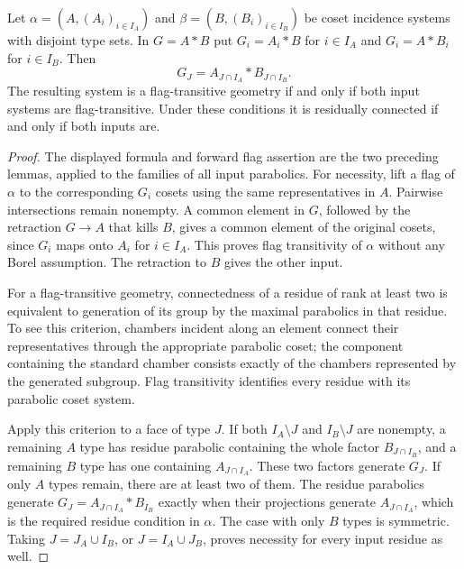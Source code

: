 \begin{theorem}\label{thm:free}
Let $\alpha=(A,(A_i)_{i\in I_A})$ and
$\beta=(B,(B_i)_{i\in I_B})$ be coset incidence systems with disjoint
type sets. In $G=A*B$ put $G_i=A_i*B$ for $i\in I_A$ and
$G_i=A*B_i$ for $i\in I_B$. Then
\[
 G_J=A_{J\cap I_A}*B_{J\cap I_B}.
\]
The resulting system is a flag-transitive geometry if and only if
both input systems are flag-transitive. Under these conditions it is
residually connected if and only if both inputs are.
\end{theorem}
\begin{proof}
The displayed formula and forward flag assertion are the two preceding
lemmas, applied to the families of all input parabolics. For necessity,
lift a flag of $\alpha$ to the corresponding $G_i$ cosets using the
same representatives in $A$. Pairwise intersections remain nonempty.
A common element in $G$, followed by the retraction $G\to A$ that
kills $B$, gives a common element of the original cosets, since
$G_i$ maps onto $A_i$ for $i\in I_A$. This proves flag transitivity
of $\alpha$ without any Borel assumption. The retraction to $B$
gives the other input.

For a flag-transitive geometry, connectedness of a residue of rank at
least two is equivalent to generation of its group by the maximal
parabolics in that residue. To see this criterion, chambers incident
along an element connect their representatives through the appropriate
parabolic coset; the component containing the standard chamber consists
exactly of the chambers represented by the generated subgroup. Flag
transitivity identifies every residue with its parabolic coset system.

Apply this criterion to a face of type $J$. If both
$I_A\setminus J$ and $I_B\setminus J$ are nonempty, a remaining
$A$ type has residue parabolic containing the whole factor
$B_{J\cap I_B}$, and a remaining $B$ type has one containing
$A_{J\cap I_A}$. These two factors generate $G_J$. If only $A$
types remain, there are at least two of them. The residue parabolics
generate $G_J=A_{J\cap I_A}*B_{I_B}$ exactly when their projections
generate $A_{J\cap I_A}$, which is the required residue condition
in $\alpha$. The case with only $B$ types is symmetric. Taking
$J=J_A\cup I_B$, or $J=I_A\cup J_B$, proves necessity for every
input residue as well.
\end{proof}

